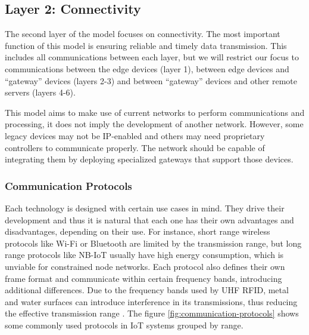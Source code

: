 \subsection{Layer 2: Connectivity}
\label{sec:iot-model-layer2}

The second layer of the model focuses on connectivity. The most important function of this model is ensuring reliable and timely data transmission. This includes all communications between each layer, but we will restrict our focus to communications between the edge devices (layer 1), between edge devices and ``gateway'' devices (layers 2-3) and between ``gateway'' devices and other remote servers (layers 4-6).\bigskip

This model aims to make use of current networks to perform communications and processing, it does not imply the development of another network. However, some legacy devices may not be IP-enabled and others may need proprietary controllers to communicate properly. The network should be capable of integrating them by deploying specialized gateways that support those devices.

\subsubsection{Communication Protocols}
Each technology is designed with certain use cases in mind. They drive their development and thus it is natural that each one has their own advantages and disadvantages, depending on their use. For instance, short range wireless protocols like Wi-Fi or Bluetooth are limited by the transmission range, but long range protocols like NB-IoT usually have high energy consumption, which is unviable for constrained node networks. Each protocol also defines their own frame format and communicate within certain frequency bands, introducing additional differences. Due to the frequency bands used by UHF \acs{RFID}, metal and water surfaces can introduce interference in its transmissions, thus reducing the effective transmission range \cite{Cairo2018}. The figure \ref{fig:communication-protocols} shows some commonly used protocols in \acs{IoT} systems grouped by range. 


